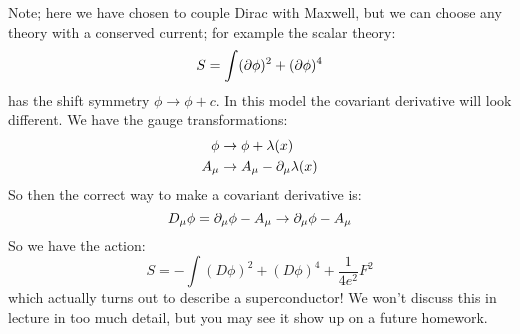 Note; here we have chosen to couple Dirac with Maxwell, but we can choose any theory with a conserved current; for example the scalar theory:
\begin{equation}
    S = \int (\partial\phi)^2 + (\partial\phi)^4
\end{equation}
has the shift symmetry $\phi \to \phi + c$. In this model the covariant derivative will look different. We have the gauge transformations:
\begin{equation}
    \begin{split}
        \phi &\to \phi + \lambda(x)
        \\ A_\mu &\to A_\mu - \partial_\mu \lambda(x)
    \end{split}
\end{equation}
So then the correct way to make a covariant derivative is:
\begin{equation}
    D_\mu \phi = \partial_\mu \phi - A_\mu \to \partial_\mu \phi - A_\mu
\end{equation}
So we have the action:
\begin{equation}
    S = -\int (D\phi)^2 + (D\phi)^4 + \frac{1}{4e^2}F^2
\end{equation}
which actually turns out to describe a superconductor! We won't discuss this in lecture in too much detail, but you may see it show up on a future homework.